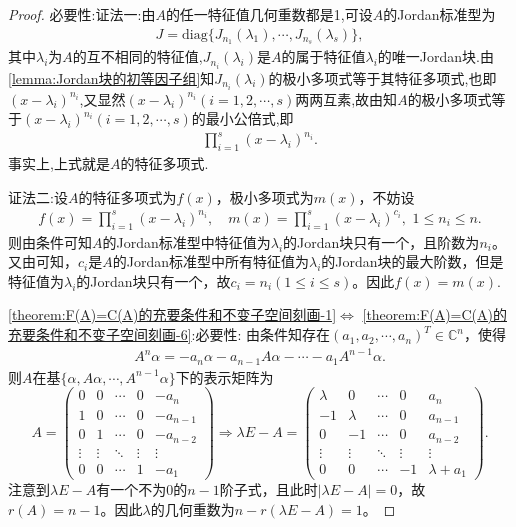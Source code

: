 \documentclass[../../main.tex]{subfiles}%
\begin{document}
\begin{proof}
{\heiti 必要性:}{\color{blue}证法一:}由$A$的任一特征值几何重数都是1,可设$A$的Jordan标准型为
\begin{align*}
J=\text{diag}\{J_{n_1}(\lambda_1),\cdots,J_{n_s}(\lambda_s)\},
\end{align*}
其中$\lambda_i$为$A$的互不相同的特征值,$J_{n_i}(\lambda_i)$是$A$的属于特征值$\lambda_i$的唯一Jordan块.由\cref{lemma:Jordan块的初等因子组}知$J_{n_i}(\lambda_i)$的极小多项式等于其特征多项式,也即$(x-\lambda_i)^{n_i}$,又显然$(x-\lambda_i)^{n_i}(i=1,2,\cdots,s)$两两互素,故由知$A$的极小多项式等于$(x-\lambda_i)^{n_i}(i=1,2,\cdots,s)$的最小公倍式,即
\begin{align*}
\prod_{i=1}^s{\left( x-\lambda _i \right) ^{n_i}}.
\end{align*}
事实上,上式就是$A$的特征多项式.

{\color{blue}证法二:}设$A$的特征多项式为$f\left( x \right)$，极小多项式为$m\left( x \right)$，不妨设
\begin{align*}
f\left( x \right) =\prod_{i=1}^s{\left( x-\lambda _i \right) ^{n_i}},\quad m\left( x \right) =\prod_{i=1}^s{\left( x-\lambda _i \right) ^{c_i}},\,\,1\leqslant n_i\leqslant n.
\end{align*}
则由条件可知$A$的Jordan标准型中特征值为$\lambda _i$的Jordan块只有一个，且阶数为$n_i$。又由可知，$c_i$是$A$的Jordan标准型中所有特征值为$\lambda _i$的Jordan块的最大阶数，但是特征值为$\lambda _i$的Jordan块只有一个，故$c_i=n_i\left( 1\leqslant i\leqslant s \right)$。因此$f\left( x \right) =m\left( x \right)$.

\noindent\ref{theorem:F(A)=C(A)的充要条件和不变子空间刻画-1}$\Leftrightarrow$ \ref{theorem:F(A)=C(A)的充要条件和不变子空间刻画-6}:{\heiti 必要性:}
由条件知存在$(a_1,a_2,\cdots,a_{n})^T \in \mathbb{C}^n$，使得
\begin{align*}
A^n\alpha = -a_{n}\alpha -a_{n-1}A\alpha -\cdots -a_1A^{n-1}\alpha.
\end{align*}
则$A$在基$\{\alpha,A\alpha,\cdots,A^{n-1}\alpha\}$下的表示矩阵为
$$A=\begin{pmatrix} 0 & 0 & \cdots & 0 & -a_n \\ 1 & 0 & \cdots & 0 & -a_{n-1} \\ 0 & 1 & \cdots & 0 & -a_{n-2} \\ \vdots & \vdots & \ddots & \vdots & \vdots \\ 0 & 0 & \cdots & 1 & -a_1 \end{pmatrix} \Longrightarrow \lambda E - A = \begin{pmatrix} \lambda & 0 & \cdots & 0 & a_n \\ -1 & \lambda & \cdots & 0 & a_{n-1} \\ 0 & -1 & \cdots & 0 & a_{n-2} \\ \vdots & \vdots & \ddots & \vdots & \vdots \\ 0 & 0 & \cdots & -1 & \lambda + a_1 \end{pmatrix}.$$
注意到$\lambda E - A$有一个不为0的$n-1$阶子式，且此时$|\lambda E - A| = 0$，故$r(A) = n-1$。因此$\lambda$的几何重数为$n - r(\lambda E - A) = 1$。


\end{proof}
\end{document}
